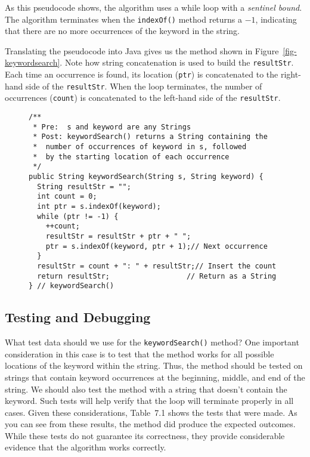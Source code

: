 \noindent As this pseudocode shows, the algorithm uses a while loop
with a {\it sentinel bound}.  The algorithm terminates when the
{\tt indexOf()} method returns a $-1$, indicating that there are no more
occurrences of the keyword in the string.

Translating the pseudocode into Java gives us the method shown in
Figure~\ref{fig-keywordsearch}.  Note how string concatenation is used
to build the \mbox{\tt resultStr}. Each time an occurrence is found, its
location ({\tt ptr}) is concatenated to the right-hand side of the
{\tt resultStr}.  When the loop terminates, the number of occurrences
({\tt count}) is concatenated to the left-hand side of the
{\tt resultStr}.

\begin{figure}[h]
\jjjprogstart
\begin{jjjlisting}
\begin{lstlisting}
/**
 * Pre:  s and keyword are any Strings
 * Post: keywordSearch() returns a String containing the
 *  number of occurrences of keyword in s, followed
 *  by the starting location of each occurrence
 */
public String keywordSearch(String s, String keyword) {
  String resultStr = "";
  int count = 0;
  int ptr = s.indexOf(keyword);
  while (ptr != -1) {
    ++count;
    resultStr = resultStr + ptr + " ";
    ptr = s.indexOf(keyword, ptr + 1);// Next occurrence
  }
  resultStr = count + ": " + resultStr;// Insert the count
  return resultStr;                  // Return as a String
} // keywordSearch()
\end{lstlisting}
\end{jjjlisting}
\end{figure}

\subsection*{Testing and Debugging}
\noindent What test data should we use for the {\tt keywordSearch()} method?
  One important consideration
in this case is to test that the method works for all possible
locations of the keyword within the string.  Thus, the method should
be tested on strings that contain keyword occurrences at the
beginning, middle, and end of the string.  We should also test the
method with a string that doesn't contain the keyword.  Such tests
will help verify that the loop will terminate properly in all cases.
Given these considerations, Table~7.1 shows the tests that were made.
As you can see from these results, the method did produce the expected
outcomes.  While these tests do not guarantee its correctness, they
provide considerable evidence that the algorithm works correctly.


